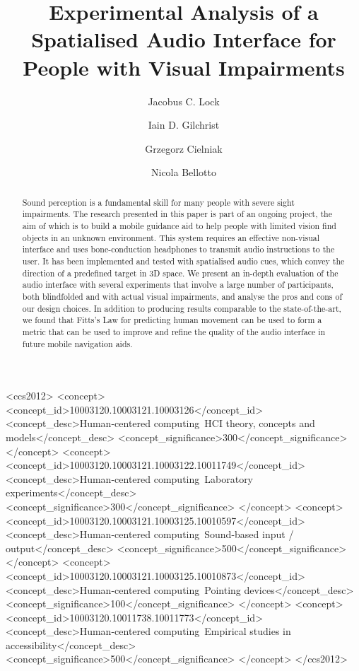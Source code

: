 \documentclass[acmsmall]{acmart}
\begin{document}
\title{Experimental Analysis of a Spatialised Audio Interface for People with Visual Impairments}

\author{Jacobus C. Lock}

\author{Iain D. Gilchrist}

\author{Grzegorz Cielniak}

\author{Nicola Bellotto}

\begin{abstract}
  Sound perception is a fundamental skill for many people with severe sight impairments.
  The research presented in this paper is part of an ongoing project, the aim of which is to build a mobile guidance aid to help people with limited vision find objects in an unknown environment.
  This system requires an effective non-visual interface and uses bone-conduction headphones to transmit audio instructions to the user.
  It has been implemented and tested with spatialised audio cues, which convey the direction of a predefined target in 3D space.
  We present an in-depth evaluation of the audio interface with several experiments that involve a large number of participants, both blindfolded and with actual visual impairments, and analyse the pros and cons of our design choices.
  In addition to producing results comparable to the state-of-the-art, we found that Fitts's Law for predicting human movement can be used to form a metric that can be used to improve and refine the quality of the audio interface in future mobile navigation aids. 
\end{abstract}

\begin{CCSXML}
<ccs2012>
<concept>
<concept_id>10003120.10003121.10003126</concept_id>
<concept_desc>Human-centered computing~HCI theory, concepts and models</concept_desc>
<concept_significance>300</concept_significance>
</concept>
<concept>
<concept_id>10003120.10003121.10003122.10011749</concept_id>
<concept_desc>Human-centered computing~Laboratory experiments</concept_desc>
<concept_significance>300</concept_significance>
</concept>
<concept>
<concept_id>10003120.10003121.10003125.10010597</concept_id>
<concept_desc>Human-centered computing~Sound-based input / output</concept_desc>
<concept_significance>500</concept_significance>
</concept>
<concept>
<concept_id>10003120.10003121.10003125.10010873</concept_id>
<concept_desc>Human-centered computing~Pointing devices</concept_desc>
<concept_significance>100</concept_significance>
</concept>
<concept>
<concept_id>10003120.10011738.10011773</concept_id>
<concept_desc>Human-centered computing~Empirical studies in accessibility</concept_desc>
<concept_significance>500</concept_significance>
</concept>
</ccs2012>
\end{CCSXML}
\end{document}
